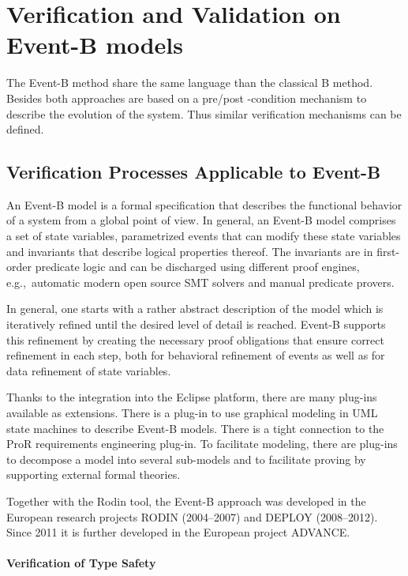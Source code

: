 \section{Verification and Validation on Event-B models}

The Event-B method share the same language than the classical  B method. Besides both approaches are based on a pre/post -condition mechanism to describe the evolution of the system. Thus similar verification mechanisms can be defined.


\subsection{Verification Processes Applicable to Event-B}
\label{sec:verif-proc-appl}

An Event-B model is a formal specification that describes the functional
behavior of a system from a global point of view. In general, an Event-B model
comprises a set of state variables, parametrized events that can modify these
state variables and invariants that describe logical properties thereof.  The
invariants are in first-order predicate logic and can be discharged using
different proof engines, e.g.,\  automatic modern open source SMT solvers and
manual predicate provers.

In general, one starts with a rather abstract description of the model which is
iteratively refined until the desired level of detail is reached. Event-B
supports this refinement by creating the necessary proof obligations that ensure
correct refinement in each step, both for behavioral refinement of events as
well as for data refinement of state variables.

Thanks to the integration into the Eclipse platform, there are many plug-ins
available as extensions. There is a plug-in to use graphical modeling in UML
state machines to describe Event-B models. There is a tight connection to the
ProR requirements engineering plug-in. To facilitate modeling, there are
plug-ins to decompose a model into several sub-models and to facilitate proving
by supporting external formal theories.

Together with the Rodin tool, the Event-B approach was developed in the European
research projects RODIN (2004--2007) and DEPLOY (2008--2012). Since 2011 it is
further developed in the European project ADVANCE\@.

\paragraph{Verification of Type Safety}
\label{sec:verif-type-safety}

